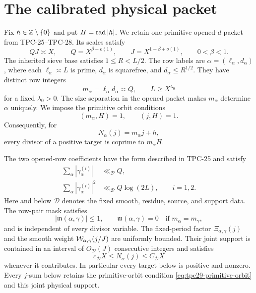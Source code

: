 \section{The calibrated physical packet}
\label{sec:tpc29-interface}

Fix $h\in\mathbb Z\setminus\{0\}$ and put $H=\operatorname{rad}|h|$.  We retain one
primitive opened-$d$ packet from TPC-25--TPC-28.  Its scales satisfy
\begin{equation}
 QJ\asymp X,\qquad
 Q=X^{\beta+o(1)},\qquad
 J=X^{1-\beta+o(1)},\qquad
 0<\beta<1.
 \label{eq:tpc29-row-scales}
\end{equation}
The inherited sieve base satisfies $1\le R<L/2$.
The row labels are $\alpha=(\ell_\alpha,d_\alpha)$, where each
$\ell_\alpha\asymp L$ is prime, $d_\alpha$ is squarefree, and
$d_\alpha\le R^{1/2}$.  They have distinct row integers
\begin{equation}
 m_\alpha=\ell_\alpha d_\alpha\asymp Q,
 \qquad L\ge X^{\lambda_0}
 \label{eq:tpc29-row-family}
\end{equation}
for a fixed $\lambda_0>0$.  The size separation in the opened packet
makes $m_\alpha$ determine $\alpha$ uniquely.  We impose the primitive
orbit conditions
\begin{equation}
 (m_\alpha,H)=1,\qquad (j,H)=1.
 \label{eq:tpc29-primitive-orbit}
\end{equation}
Consequently, for
\begin{equation}
 N_\alpha(j)=m_\alpha j+h,
 \label{eq:tpc29-target}
\end{equation}
every divisor of a positive target is coprime to $m_\alpha H$.

The two opened-row coefficients have the form described in TPC-25
\citep{WangTPC25} and satisfy
\begin{align}
 \sum_\alpha|\gamma_\alpha^{(i)}|&\ll_{\mathscr D}Q,
 \label{eq:tpc29-row-l1}\\
 \sum_\alpha|\gamma_\alpha^{(i)}|^2
 &\ll_{\mathscr D}Q\log(2L),
 \qquad i=1,2.
 \label{eq:tpc29-row-l2}
\end{align}
Here and below $\mathscr D$ denotes the fixed smooth, residue, source,
and support data.  The row-pair mask satisfies
\begin{equation}
 |\mathfrak m(\alpha,\gamma)|\le1,
 \qquad
 \mathfrak m(\alpha,\gamma)=0
 \quad\text{if }m_\alpha=m_\gamma,
 \label{eq:tpc29-row-mask}
\end{equation}
and is independent of every divisor variable.  The fixed-period
factor $\Xi_{\alpha,\gamma}(j)$ and the smooth weight
$\mathcal W_{\alpha,\gamma}(j/J)$ are uniformly bounded.  Their joint support
is contained in an interval of $O_{\mathscr D}(J)$ consecutive
integers and satisfies
\begin{equation}
 c_{\mathscr D}X\le N_\alpha(j)\le C_{\mathscr D}X
 \label{eq:tpc29-target-support}
\end{equation}
whenever it contributes.  In particular every target below is
positive and nonzero.  Every $j$-sum below retains the primitive-orbit
condition \eqref{eq:tpc29-primitive-orbit} and this joint physical
support.

